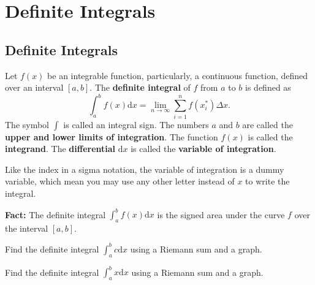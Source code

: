 
\hypertarget{definite-integrals}{%
\section{Definite Integrals}\label{definite-integrals}}

\hypertarget{definite-integrals-1}{%
\subsection{Definite Integrals}\label{definite-integrals-1}}

\begin{definition}

Let \(f(x)\) be an integrable function, particularly, a continuous
function, defined over an interval \([a,b]\). The \textbf{definite
integral} of \(f\) from \(a\) to \(b\) is defined as
\[\int^b_af(x)\mathrm{d}x=\lim\limits_{n\to\infty}\sum\limits_{i=1}^nf(x^*_i)\Delta x.\]
The symbol \(\int\) is called an integral sign. The numbers \(a\) and
\(b\) are called the \textbf{upper and lower limits of integration}. The
function \(f(x)\) is called the \textbf{integrand}. The
\textbf{differential} \(\mathrm{d} x\) is called the \textbf{variable of
integration}.

\end{definition}

Like the index in a sigma notation, the variable of integration is a
dummy variable, which mean you may use any other letter instead of \(x\)
to write the integral.

\textbf{Fact:} The definite integral \(\int_a^bf(x)\mathrm{d}x\) is the
signed area under the curve \(f\) over the interval \([a, b]\).

\begin{example}

Find the definite integral \(\int_a^bc\mathrm{d}x\) using a Riemann sum
and a graph.

\end{example}
\vspace*{6\baselineskip}

\begin{example}

Find the definite integral \(\int_a^bx\mathrm{d}x\) using a Riemann sum
and a graph.

\end{example}
\vspace*{6\baselineskip}

